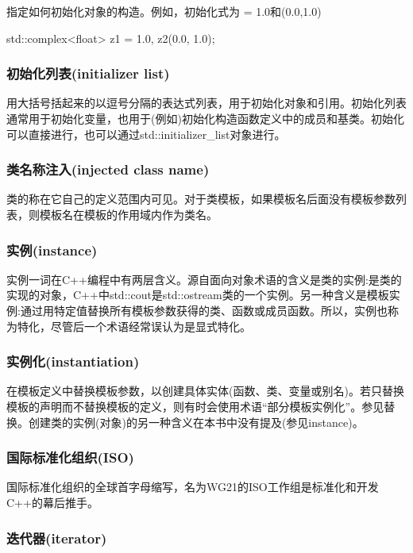 指定如何初始化对象的构造。例如，初始化式为 = 1.0和(0.0,1.0)
\begin{cpp}
std::complex<float> z1 = 1.0, z2(0.0, 1.0);
\end{cpp}

\subsubsection{初始化列表(initializer list)}

用大括号括起来的以逗号分隔的表达式列表，用于初始化对象和引用。初始化列表通常用于初始化变量，也用于(例如)初始化构造函数定义中的成员和基类。初始化可以直接进行，也可以通过std::initializer\_list对象进行。

\subsubsection{类名称注入(injected class name)}

类的称在它自己的定义范围内可见。对于类模板，如果模板名后面没有模板参数列表，则模板名在模板的作用域内作为类名。

\subsubsection{实例(instance)}

实例一词在C++编程中有两层含义。源自面向对象术语的含义是类的实例:是类的实现的对象，C++中std::cout是std::ostream类的一个实例。另一种含义是模板实例:通过用特定值替换所有模板参数获得的类、函数或成员函数。所以，实例也称为特化，尽管后一个术语经常误认为是显式特化。

\subsubsection{实例化(instantiation)}

在模板定义中替换模板参数，以创建具体实体(函数、类、变量或别名)。若只替换模板的声明而不替换模板的定义，则有时会使用术语“部分模板实例化”。参见替换。创建类的实例(对象)的另一种含义在本书中没有提及(参见instance)。

\subsubsection{国际标准化组织(ISO)}

国际标准化组织的全球首字母缩写，名为WG21的ISO工作组是标准化和开发C++的幕后推手。

\subsubsection{迭代器(iterator)}

